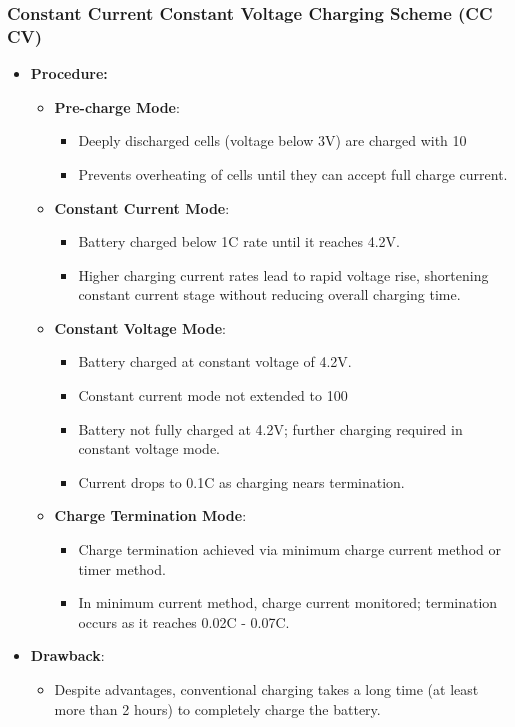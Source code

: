 \documentclass[conference]{IEEEtran}
\begin{document}
\subsubsection{Constant Current Constant Voltage Charging Scheme (CC CV) }
\begin{itemize}
    \item \textbf{Procedure:}
    \begin{itemize}
        \item \textbf{Pre-charge Mode}:
        \begin{itemize}
            \item Deeply discharged cells (voltage below 3V) are charged with 10%
            \item Prevents overheating of cells until they can accept full charge current.
        \end{itemize}
        
        \item \textbf{Constant Current Mode}:
        \begin{itemize}
            \item Battery charged below 1C rate until it reaches 4.2V.
            \item Higher charging current rates lead to rapid voltage rise, shortening constant current stage without reducing overall charging time.
        \end{itemize}
        
        \item \textbf{Constant Voltage Mode}:
        \begin{itemize}
            \item Battery charged at constant voltage of 4.2V.
            \item Constant current mode not extended to 100%
            \item Battery not fully charged at 4.2V; further charging required in constant voltage mode.
            \item Current drops to 0.1C as charging nears termination.
        \end{itemize}
        
        \item \textbf{Charge Termination Mode}:
        \begin{itemize}
            \item Charge termination achieved via minimum charge current method or timer method.
            \item In minimum current method, charge current monitored; termination occurs as it reaches 0.02C - 0.07C.
        \end{itemize}
    \end{itemize}
    
    \item \textbf{Drawback}:
    \begin{itemize}
        \item Despite advantages, conventional charging takes a long time (at least more than 2 hours) to completely charge the battery.
    \end{itemize}
\end{itemize}
\end{document}
